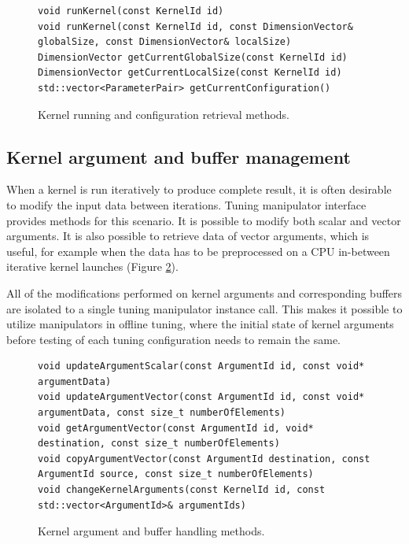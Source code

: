 \documentclass
[
    digital, %
    oneside, %
    table, %
    nolof, %
    nolot, %
    nocover %
]{fithesis3}
\begin{document}
\begin{figure}
\begin{adjustwidth}{-1cm}{-1cm}
\begin{lstlisting}
void runKernel(const KernelId id)
void runKernel(const KernelId id, const DimensionVector& globalSize, const DimensionVector& localSize)
DimensionVector getCurrentGlobalSize(const KernelId id)
DimensionVector getCurrentLocalSize(const KernelId id)
std::vector<ParameterPair> getCurrentConfiguration()
\end{lstlisting}
\caption{Kernel running and configuration retrieval methods.}
\label{ktt-manipulator-kernel-methods}
\end{adjustwidth}
\end{figure}

\subsection{Kernel argument and buffer management}
When a kernel is run iteratively to produce complete result, it is often desirable to modify the input data between iterations. Tuning manipulator
interface provides methods for this scenario. It is possible to modify both scalar and vector arguments. It is also possible to retrieve data of
vector arguments, which is useful, for example when the data has to be preprocessed on a CPU in-between iterative kernel launches (Figure
\ref{ktt-manipulator-buffer-methods}).

All of the modifications performed on kernel arguments and corresponding buffers are isolated to a single tuning manipulator instance call. This makes
it possible to utilize manipulators in offline tuning, where the initial state of kernel arguments before testing of each tuning configuration needs to
remain the same.

\begin{figure}
\begin{adjustwidth}{-1cm}{-1cm}
\begin{lstlisting}
void updateArgumentScalar(const ArgumentId id, const void* argumentData)
void updateArgumentVector(const ArgumentId id, const void* argumentData, const size_t numberOfElements)
void getArgumentVector(const ArgumentId id, void* destination, const size_t numberOfElements)
void copyArgumentVector(const ArgumentId destination, const ArgumentId source, const size_t numberOfElements)
void changeKernelArguments(const KernelId id, const std::vector<ArgumentId>& argumentIds)
\end{lstlisting}
\caption{Kernel argument and buffer handling methods.}
\label{ktt-manipulator-buffer-methods}
\end{adjustwidth}
\end{figure}
\end{document}
